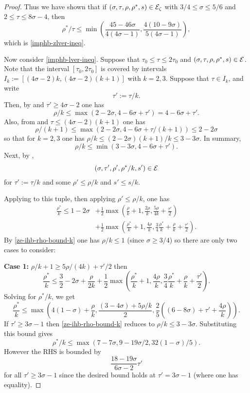 \begin{proof}
Thus we have shown that if $(\sigma, \tau, \rho, \rho^*, s) \in \mathcal{E}_\zeta$ with $3/4 \le \sigma \le 5/6$ and $2 \le \tau \le 8\sigma - 4$, then
\[
\rho^*/\tau \le \min\left(\frac{45 - 46\sigma}{4(4\sigma - 1)}, \frac{4(10 - 9\sigma)}{5(4\sigma - 1)}\right),
\]
which is \eqref{imphb-zlver-ineq}.

Now consider \eqref{imphb-lver-ineq}. Suppose that $\tau_0 \le \tau \le 2\tau_0$ and $(\sigma, \tau, \rho, \rho^*, s) \in \mathcal{E}$. Note that the interval $[\tau_0, 2\tau_0]$ is covered by intervals $I_k := [(4\sigma - 2)k, (4\sigma - 2)(k + 1)]$ with $k = 2, 3$. Suppose that $\tau \in I_k$, and write
\[
\tau' := \tau/k.
\]
Then, by  and $\tau' \ge 4\sigma - 2$ one has
\[
\rho/k \le \max(2 - 2\sigma, 4 - 6\sigma + \tau') = 4 - 6\sigma + \tau'.
\]
Also, from  and $\tau \le (4\sigma - 2)(k + 1)$ one has
\[
\rho/(k + 1) \le \max(2 - 2\sigma, 4 - 6\sigma + \tau/(k + 1)) \le 2 - 2\sigma
\]
so that for $k = 2,3$ one has $\rho/k \le (2 - 2\sigma)(k + 1)/k \le 3 - 3\sigma$.
In summary,
\begin{equation}\label{ze-ihb-rho-bound-k}
\rho/k \le \min(3 - 3\sigma, 4 - 6\sigma + \tau').
\end{equation}
Next, by ,
\[
(\sigma, \tau', \rho', \rho^*/k, s') \in \mathcal{E}
\]
for $\tau' := \tau/k$ and some $\rho' \le \rho/k$ and $s' \le s/k$.

Applying  to this tuple, then applying $\rho' \le \rho/k$, one has
\begin{align*}
\frac{\rho^*}{k} \leq 1-2\sigma &+ \frac{1}{2}\max\left(\frac{\rho}{k}+1, \frac{2\rho}{k}, \frac{5\rho}{4k} + \frac{\tau'}{2}\right) \\
&+ \frac{1}{2}\max\left(\frac{\rho^*}{k}+1, \frac{4\rho}{k}, \frac{3}{4}\frac{\rho^*}{k} +\frac{\rho}{k}+\frac{\tau'}{2}\right).
\end{align*}
By \eqref{ze-ihb-rho-bound-k} one has $\rho/k \le 1$ (since $\sigma \ge 3/4$) so there are only two cases to consider:

\textbf{Case 1:} $\rho/k + 1 \ge 5\rho/(4k) + \tau'/2$ then
\[
\frac{\rho^*}{k} \le \frac{3}{2} - 2\sigma + \frac{\rho}{2k} + \frac{1}{2}\max\left(\frac{\rho^*}{k}+1, \frac{4\rho}{k}, \frac{3}{4}\frac{\rho^*}{k} +\frac{\rho}{k}+\frac{\tau'}{2}\right).
\]
Solving for $\rho^*/k$, we get
\[
\frac{\rho^*}{k} \le \max\left(4(1 - \sigma) + \frac{\rho}{k}, \frac{(3 - 4\sigma) + 5\rho/k}{2}, \frac{2}{5}((6 - 8\sigma) + \tau' + \frac{4\rho}{k})\right).
\]
If $\tau' \ge 3\sigma - 1$ then \eqref{ze-ihb-rho-bound-k} reduces to $\rho/k \le 3-3\sigma$. Substituting this bound gives
\[
\rho^*/k \le \max(7 - 7\sigma, 9 - 19\sigma/2, 32(1 - \sigma)/5).
\]
However the RHS is bounded by
\begin{equation}\label{ze-ihb-rho-1}
\frac{18 - 19\sigma}{6\sigma - 2}\tau'
\end{equation}
for all $\tau' \ge 3\sigma - 1$ since the desired bound holds at $\tau' = 3\sigma - 1$ (where one has equality).


\end{proof}
